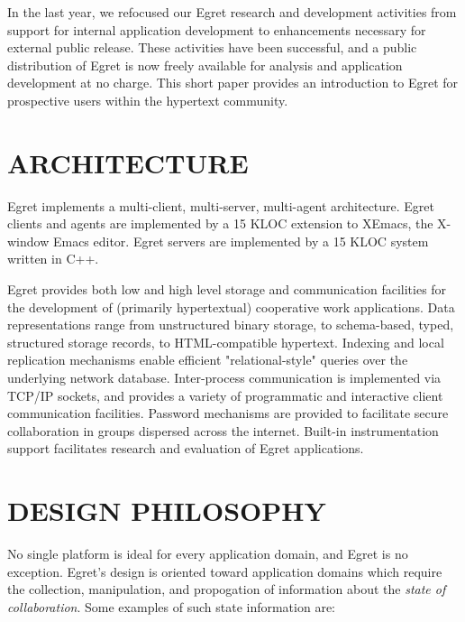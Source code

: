 In the last year, we refocused our Egret research and development
activities from support for internal application development to
enhancements necessary for external public release. These activities have
been successful, and a public distribution of Egret is now freely available
for analysis and application development at no charge.  This short paper
provides an introduction to Egret for prospective users within the hypertext
community.


\section{ARCHITECTURE}

Egret implements a multi-client, multi-server, multi-agent architecture.
Egret clients and agents are implemented by a 15 KLOC extension to XEmacs,
the X-window Emacs editor. Egret servers are implemented by a 15 KLOC
system written in C++.   

Egret provides both low and high level storage and communication facilities
for the development of (primarily hypertextual) cooperative work applications.
Data representations range from unstructured binary storage, to
schema-based, typed, structured storage records, to HTML-compatible
hypertext. Indexing and local replication mechanisms enable efficient
"relational-style" queries over the underlying network database.
Inter-process communication is implemented via TCP/IP sockets, and provides
a variety of programmatic and interactive client communication facilities.
Password mechanisms are provided to facilitate secure collaboration in
groups dispersed across the internet. Built-in instrumentation support
facilitates research and evaluation of Egret applications.


\section{DESIGN PHILOSOPHY}

No single platform is ideal for every application domain, and Egret is no
exception.  Egret's design is oriented toward application
domains which require the collection, manipulation, and propogation of 
information about the {\em state of collaboration}. Some examples of such 
state information are:

